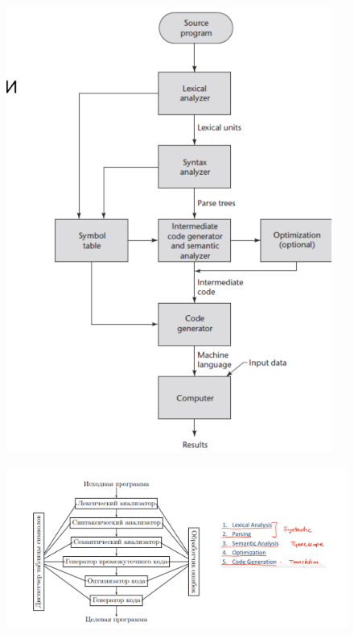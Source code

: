 \documentclass{article}
\begin{document}
    \begin{figure}[H]
        \centering
        \includegraphics[width=1\linewidth]{Снимок экрана 2025-02-13 083723.png}
    \end{figure}

    \begin{figure}[H]
        \centering
        \includegraphics[width=1\linewidth]{Снимок экрана 2025-02-13 084306.png}
    \end{figure}
\end{document}
